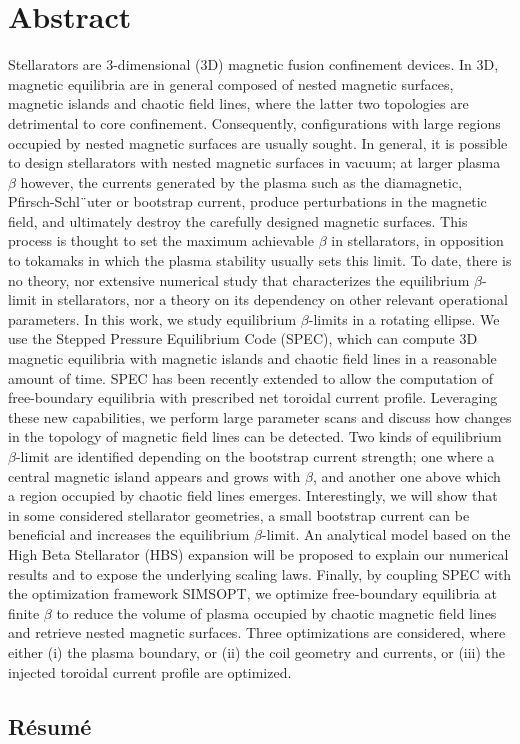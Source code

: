 

\cleardoublepage
\chapter*{Abstract}
Stellarators are 3-dimensional (3D) magnetic fusion confinement devices. In 3D, magnetic equilibria are in general composed of nested magnetic surfaces, magnetic islands and chaotic field lines, where the latter two topologies are detrimental to core confinement. Consequently, configurations with large regions occupied by nested magnetic surfaces are usually sought. In general, it is possible to design stellarators with nested magnetic surfaces in vacuum; at larger plasma $\beta$ however, the currents generated by the plasma such as the diamagnetic, Pfirsch-Schl¨uter or bootstrap current, produce perturbations in the magnetic field, and ultimately destroy the carefully designed magnetic surfaces. This process is thought to set the maximum achievable $\beta$ in stellarators, in opposition to tokamaks in which the plasma stability usually sets this limit. To date, there is no theory, nor extensive numerical study that characterizes the equilibrium $\beta$-limit in stellarators, nor a theory on its dependency on other relevant operational parameters. In this work, we study equilibrium $\beta$-limits in a rotating ellipse. We use the Stepped Pressure Equilibrium Code (SPEC), which can compute 3D magnetic equilibria with magnetic islands and chaotic field lines in a reasonable amount of time. SPEC has been recently extended to allow the computation of free-boundary equilibria with prescribed net toroidal current profile. Leveraging these new capabilities, we perform large parameter scans and discuss how changes in the topology of magnetic field lines can be detected. Two kinds of equilibrium $\beta$-limit are identified depending on the bootstrap current strength; one where a central magnetic island appears and grows with $\beta$, and another one above which a region occupied by chaotic field lines emerges. Interestingly, we will show that in some considered stellarator geometries, a small bootstrap current can be beneficial and increases the equilibrium $\beta$-limit. An analytical model based on the High Beta Stellarator (HBS) expansion will be proposed to explain our numerical results and to expose the underlying scaling laws. Finally, by coupling SPEC with the optimization framework SIMSOPT, we optimize free-boundary equilibria at finite $\beta$ to reduce the volume of plasma occupied by chaotic magnetic field lines and retrieve nested magnetic surfaces. Three optimizations are considered, where either (i) the plasma boundary, or (ii) the coil geometry and currents, or (iii) the injected toroidal current profile are optimized.

\begin{otherlanguage}{french}
\cleardoublepage
\chapter*{Résumé}
\lipsum[1-2]
\end{otherlanguage}


